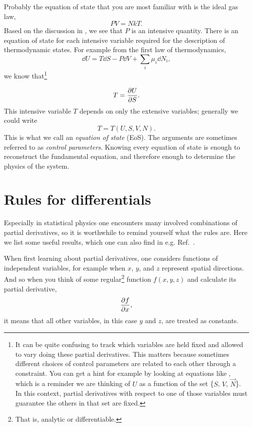 Probably the equation of state that you are most familiar with is the 
ideal gas law,
\begin{equation}
  PV=NkT.
\end{equation}
Based on the discussion in , we see that $P$ is
an intensive quantity.
There is an equation of state for each intensive variable required for the
description of thermodynamic states. For example from the
first law of thermodynamics,
\begin{equation}\label{eq:fslaw}
  \dd{U}=T\dd{S}-P\dd{V}+\sum_i\mu_i\dd{N}_i,
\end{equation}
we know that\footnote{It can be quite confusing to track which variables
are held fixed and allowed to vary doing these partial derivatives.
This matters because sometimes different choices of control parameters
are related to each other through a constraint.
You can get a hint for example by looking at equations like
, which is a reminder we are thinking of
$U$ as a function of the set \{$S$, $V$, $\vec{N}$\}. In this context,
partial derivatives with respect to one of those variables must
guarantee the others in that set are fixed.}

\begin{equation}
  T=\pdv{U}{S}.
\end{equation}
This intensive variable $T$ depends on only the extensive variables; 
generally we could write
\begin{equation}
  T=T(U,S,V,N).
\end{equation}
This is what we call an {\it equation of state}
(EoS). The arguments are sometimes referred to as 
{\it control parameters}. Knowing every equation 
of state is enough to reconstruct the fundamental equation, and therefore 
enough to determine the physics of the system.

\section{Rules for differentials}\label{sec:thermdiff}

Especially in statistical physics one encounters many involved combinations
of partial derivatives, so it is worthwhile to remind yourself what the
rules are. Here we list some useful results, which one can also
find in e.g. Ref.~\cite{huang_introduction_2001}.

When first learning about partial derivatives, one considers functions
of independent variables, for example when $x$, $y$, and $z$ represent
spatial directions. And so when you think of some
regular\footnote{That is, analytic or differentiable.} 
function $f(x,y,z)$
and calculate its partial derivative,
\begin{equation}
\pdv{f}{x},
\end{equation}
it means that all other variables, in this case $y$ and $z$, are treated as
constants.


